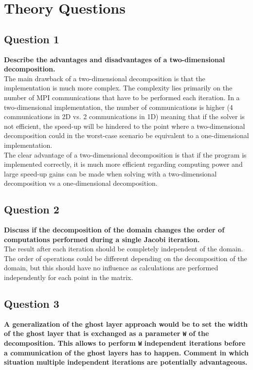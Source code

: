 \section*{Theory Questions}

\subsection*{Question 1}
\textbf{Describe the advantages and disadvantages of a two-dimensional decomposition.} \\

The main drawback of a two-dimensional decomposition is that the implementation is much more complex. 
The complexity lies primarily on the number of MPI communications that have to be performed each iteration. 
In a two-dimensional implementation, the number of communications is higher (4 communications in 2D vs. 
2 communications in 1D) meaning that if the solver is not efficient, the speed-up will be hindered to the point where a two-dimensional 
decomposition could in the worst-case scenario be equivalent to a one-dimensional implementation. \\

The clear advantage of a two-dimensional decomposition is that if the program is implemented correctly, it is much more efficient 
regarding computing power and large speed-up gains can be made when solving with a two-dimensional decomposition vs a one-dimensional decomposition.

\subsection*{Question 2}
\textbf{Discuss if the decomposition of the domain changes the order of computations performed during a single Jacobi iteration.} \\

The result after each iteration should be completely independent of the domain. 
The order of operations could be different depending on the decomposition of the domain, 
but this should have no influence as calculations are performed independently for each point in the matrix.

\subsection*{Question 3}
\textbf{A generalization of the ghost layer approach would be to set the width of the ghost layer that is exchanged as a parameter \texttt{W} of 
the decomposition. This allows to perform \texttt{W} independent iterations before a communication of the ghost layers has to happen.
Comment in which situation multiple independent iterations are potentially advantageous.} \\

